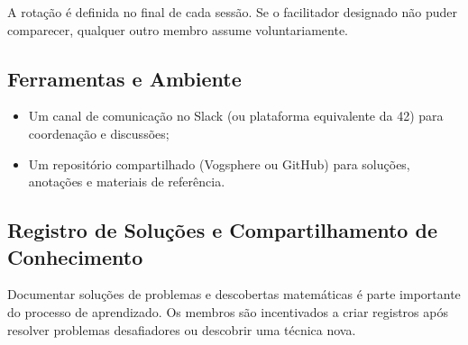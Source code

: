 A rotação é definida no final de cada sessão. Se o facilitador designado não puder
comparecer, qualquer outro membro assume voluntariamente.

\subsection{Ferramentas e Ambiente}

\begin{itemize}
  \item Um canal de comunicação no Slack (ou plataforma equivalente da 42) para coordenação
    e discussões;
  \item Um repositório compartilhado (Vogsphere ou GitHub) para soluções, anotações e
    materiais de referência.
\end{itemize}

\subsection{Registro de Soluções e Compartilhamento de Conhecimento}

Documentar soluções de problemas e descobertas matemáticas é parte importante do processo
de aprendizado. Os membros são incentivados a criar registros após resolver problemas
desafiadores ou descobrir uma técnica nova.
